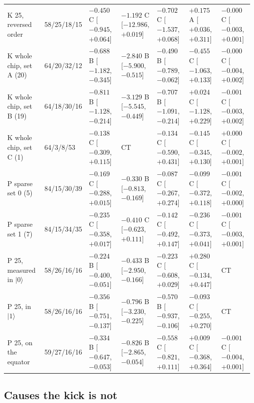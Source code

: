 \documentclass[reprint,amsmath,amssymb,aps,superscriptaddress,nofootinbib]{revtex4-2}
\begin{document}
\begin{table}[!tp]
\begin{tabular}{p{3.6cm}p{1.6cm}p{2.15cm}p{2.15cm}p{2.15cm}p{2.15cm}p{2.15cm}}
K 25, reversed order & 58/25/18/15 & $-0.450$ C [$-0.945$,$+0.064$] & $-1.192$ C [$-12.986$,$+0.019$] & $-0.702$ C [$-1.537$,$+0.068$] & $+0.175$ A [$+0.036$,$+0.311$] & $-0.000$ C [$-0.003$,$+0.001$] \\
K whole chip, set A (20) & 64/20/32/12 & $-0.688$ B [$-1.182$,$-0.345$] & $-2.840$ B [$-5.900$,$-0.515$] & $-0.490$ B [$-0.789$,$-0.062$] & $-0.455$ C [$-1.063$,$+0.133$] & $-0.000$ C [$-0.004$,$+0.002$] \\
K whole chip, set B (19) & 64/18/30/16 & $-0.811$ B [$-1.128$,$-0.214$] & $-3.129$ B [$-5.545$,$-0.449$] & $-0.707$ B [$-1.091$,$-0.214$] & $+0.024$ C [$-1.128$,$+0.229$] & $-0.001$ C [$-0.003$,$+0.002$] \\
K whole chip, set C (1) & 64/3/8/53 & $-0.138$ C [$-0.309$,$+0.115$] & CT & $-0.134$ C [$-0.590$,$+0.431$] & $-0.145$ C [$-0.345$,$+0.130$] & $+0.000$ C [$-0.002$,$+0.001$] \\
P sparse set 0 (5) & 84/15/30/39 & $-0.169$ C [$-0.288$,$+0.015$] & $-0.330$ B [$-0.813$,$-0.169$] & $-0.087$ C [$-0.267$,$+0.274$] & $-0.099$ C [$-0.372$,$+0.118$] & $-0.001$ C [$-0.002$,$+0.000$] \\
P sparse set 1 (7) & 84/15/34/35 & $-0.235$ C [$-0.358$,$+0.017$] & $-0.410$ C [$-0.623$,$+0.111$] & $-0.142$ C [$-0.492$,$+0.147$] & $-0.236$ C [$-0.373$,$+0.041$] & $-0.001$ C [$-0.003$,$+0.001$] \\
P 25, measured in $|0\rangle$ & 58/26/16/16 & $-0.224$ B [$-0.400$,$-0.051$] & $-0.433$ B [$-2.950$,$-0.166$] & $-0.223$ C [$-0.608$,$+0.029$] & $+0.280$ C [$-0.134$,$+0.447$] & CT \\
P 25, in $|1\rangle$ & 58/26/16/16 & $-0.356$ B [$-0.751$,$-0.137$] & $-0.796$ B [$-3.230$,$-0.225$] & $-0.570$ B [$-0.937$,$-0.106$] & $-0.093$ C [$-0.255$,$+0.270$] & CT \\
P 25, on the equator & 59/27/16/16 & $-0.334$ B [$-0.647$,$-0.053$] & $-0.826$ B [$-2.865$,$-0.054$] & $-0.558$ C [$-0.821$,$+0.111$] & $+0.009$ C [$-0.368$,$+0.364$] & $-0.001$ C [$-0.004$,$+0.001$] \\
\bottomrule
\end{tabular}
\end{table}

\subsection{Causes the kick is not}\label{sec:causes}
\end{document}

